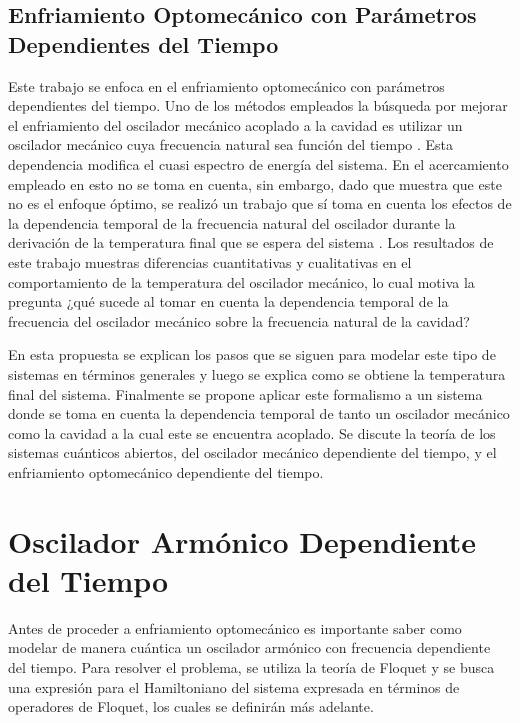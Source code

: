 \documentclass[10pt,a4paper]{report}
\begin{document}
\section{Enfriamiento Optomecánico con Parámetros Dependientes del Tiempo}

Este trabajo se enfoca en el enfriamiento optomecánico con parámetros dependientes del tiempo. Uno de los métodos empleados la búsqueda por mejorar el enfriamiento del oscilador mecánico acoplado a la cavidad es utilizar un oscilador mecánico cuya frecuencia natural sea función del tiempo \cite{BarberisLC}. Esta dependencia modifica el cuasi espectro de energía del sistema\cite{HanngiFM}. En el acercamiento empleado en \cite{BarberisLC} esto no se toma en cuenta, sin embargo, dado que \cite{HanngiFM} muestra que este no es el enfoque óptimo, se realizó un trabajo que sí toma en cuenta los efectos de la dependencia temporal de la frecuencia natural del oscilador durante la derivación  de la temperatura final que se espera del sistema \cite{YanesOC}. Los resultados de este trabajo muestras diferencias cuantitativas y cualitativas en el comportamiento de la temperatura del oscilador mecánico, lo cual motiva la pregunta ¿qué sucede al tomar en cuenta la dependencia temporal de la frecuencia del oscilador mecánico sobre la frecuencia natural de la cavidad? 

En esta propuesta se explican los pasos que se siguen para modelar este tipo de sistemas en términos generales y luego se explica como se obtiene la temperatura final del sistema. Finalmente se propone aplicar este formalismo a un sistema donde se toma en cuenta la dependencia temporal de tanto un oscilador mecánico como la cavidad a la cual este se encuentra acoplado. Se discute la teoría de los sistemas cuánticos abiertos, del oscilador mecánico dependiente del tiempo, y el enfriamiento optomecánico dependiente del tiempo.




\chapter{Oscilador Armónico Dependiente del Tiempo}

Antes de proceder a enfriamiento optomecánico es importante saber como modelar de manera cuántica un oscilador armónico con frecuencia dependiente del tiempo. Para resolver el problema, se utiliza la teoría de Floquet \cite{WardFT} y se busca una expresión para el Hamiltoniano del sistema expresada en términos de operadores de Floquet, los cuales se definirán más adelante.
\end{document}
